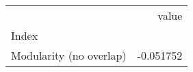 \begin{tabular}{lr}
\toprule
{} &     value \\
Index                   &           \\
\midrule
Modularity (no overlap) & -0.051752 \\
\bottomrule
\end{tabular}
